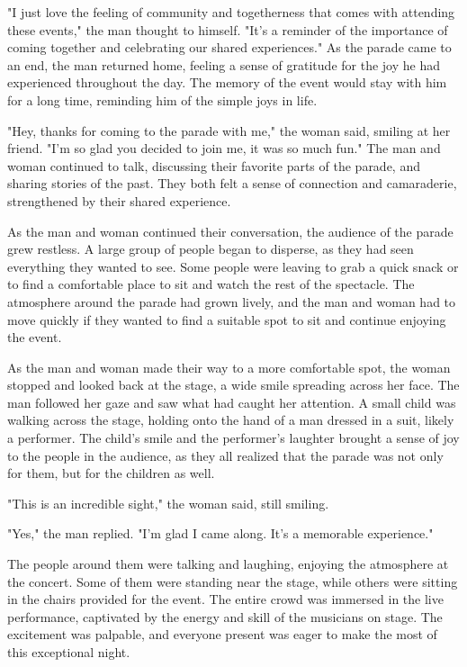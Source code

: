 \documentclass[smalldemyvopaper,11pt,twoside,onecolumn,openright,extrafontsizes]{memoir}
\begin{document}
"I just love the feeling of community and togetherness that comes with attending these events," the man thought to himself. "It's a reminder of the importance of coming together and celebrating our shared experiences." As the parade came to an end, the man returned home, feeling a sense of gratitude for the joy he had experienced throughout the day. The memory of the event would stay with him for a long time, reminding him of the simple joys in life.\par
"Hey, thanks for coming to the parade with me," the woman said, smiling at her friend. "I'm so glad you decided to join me, it was so much fun." The man and woman continued to talk, discussing their favorite parts of the parade, and sharing stories of the past. They both felt a sense of connection and camaraderie, strengthened by their shared experience.\par
As the man and woman continued their conversation, the audience of the parade grew restless. A large group of people began to disperse, as they had seen everything they wanted to see. Some people were leaving to grab a quick snack or to find a comfortable place to sit and watch the rest of the spectacle. The atmosphere around the parade had grown lively, and the man and woman had to move quickly if they wanted to find a suitable spot to sit and continue enjoying the event.\par
As the man and woman made their way to a more comfortable spot, the woman stopped and looked back at the stage, a wide smile spreading across her face. The man followed her gaze and saw what had caught her attention. A small child was walking across the stage, holding onto the hand of a man dressed in a suit, likely a performer. The child's smile and the performer's laughter brought a sense of joy to the people in the audience, as they all realized that the parade was not only for them, but for the children as well.\par
"This is an incredible sight," the woman said, still smiling.\par
"Yes," the man replied. "I'm glad I came along. It's a memorable experience."\par
The people around them were talking and laughing, enjoying the atmosphere at the concert. Some of them were standing near the stage, while others were sitting in the chairs provided for the event. The entire crowd was immersed in the live performance, captivated by the energy and skill of the musicians on stage. The excitement was palpable, and everyone present was eager to make the most of this exceptional night.\par
\end{document}
